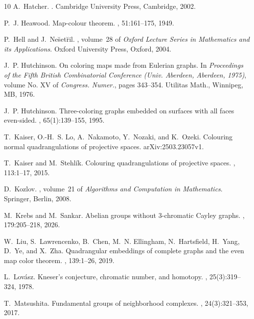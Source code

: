 \documentclass[11pt, amsfonts]{amsart}
\numberwithin{equation}{section}
\theoremstyle{definition}
\theoremstyle{remark}
\begin{document}
\begin{thebibliography}{10}
A.~Hatcher.
.
\newblock Cambridge University Press, Cambridge, 2002.

P.~J. Heawood.
\newblock Map-colour theorem.
, 51:161--175, 1949.

P.~Hell and J.~Ne\u{s}et\u{r}il.
, volume~28 of {\em Oxford Lecture
  Series in Mathematics and its Applications}.
\newblock Oxford University Press, Oxford, 2004.

J.~P. Hutchinson.
\newblock On coloring maps made from {E}ulerian graphs.
\newblock In {\em Proceedings of the {F}ifth {B}ritish {C}ombinatorial
  {C}onference ({U}niv. {A}berdeen, {A}berdeen, 1975)}, volume No. XV of {\em
  Congress. Numer.}, pages 343--354. Utilitas Math., Winnipeg, MB, 1976.

J.~P. Hutchinson.
\newblock Three-coloring graphs embedded on surfaces with all faces even-sided.
, 65(1):139--155, 1995.

T.~Kaiser, O.-H.~S. Lo, A.~Nakamoto, Y.~Nozaki, and K.~Ozeki.
\newblock Colouring normal quadrangulations of projective spaces.
\newblock arXiv:2503.23057v1.

T.~Kaiser and M.~Stehl\'ik.
\newblock Colouring quadrangulations of projective spaces.
, 113:1--17, 2015.

D.~Kozlov.
, volume~21 of {\em Algorithms
  and Computation in Mathematics}.
\newblock Springer, Berlin, 2008.

M.~Krebs and M.~Sankar.
\newblock Abelian groups without 3-chromatic {C}ayley graphs.
, 179:205--218, 2026.

W.~Liu, S.~Lawrencenko, B.~Chen, M.~N. Ellingham, N.~Hartsfield, H.~Yang,
  D.~Ye, and X.~Zha.
\newblock Quadrangular embeddings of complete graphs and the even map color
  theorem.
, 139:1--26, 2019.

L.~Lov\'asz.
\newblock Kneser's conjecture, chromatic number, and homotopy.
, 25(3):319--324, 1978.

T.~Matsushita.
\newblock Fundamental groups of neighborhood complexes.
, 24(3):321--353, 2017.


\end{thebibliography}
\end{document}
